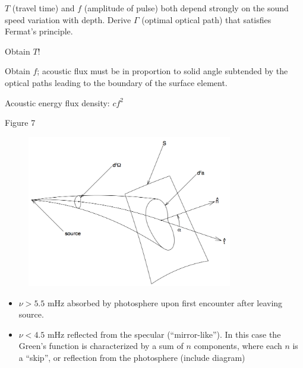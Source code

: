 \documentclass{beamer}
\begin{document}
\begin{frame}{8.4}
\end{frame}

\begin{frame}{8.5}
    $T$ (travel time) and $f$ (amplitude of pulse) both depend
    strongly on the sound speed variation with depth.
    Derive $\Gamma$ (optimal optical path) that satisfies
    Fermat's principle.

    Obtain $T$!
\end{frame}

\begin{frame}{8.6}
    Obtain $f$; acoustic flux must be in proportion to solid angle
    subtended by the optical paths leading to the boundary of the
    surface element.

    Acoustic energy flux density: $cf^{2}$
\end{frame}

\begin{frame}{Figure 7}
    \begin{figure}
        \includegraphics[width=0.8\textwidth]{fig_7.png}
    \end{figure}
\end{frame}

\begin{frame}{8.7}
    \begin{itemize}
        \item $\nu>5.5$ mHz absorbed by photosphere upon first
            encounter after leaving source.
        \item $\nu<4.5$ mHz reflected from the specular
            (``mirror-like''). In this case the Green's function
            is characterized by a sum of $n$ components, where
            each $n$ is a ``skip'', or reflection from the photosphere
            (include diagram)
    \end{itemize}
\end{frame}
\end{document}
